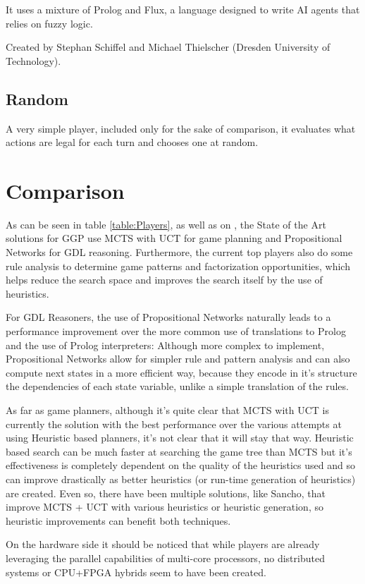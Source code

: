 It uses a mixture of Prolog and Flux, a language designed to write AI agents that relies on fuzzy logic.

Created by Stephan Schiffel and Michael Thielscher (Dresden University of Technology).

\subsection{Random}
A very simple player, included only for the sake of comparison, it evaluates what actions are legal for each turn and chooses one at random.




%
%

\section{Comparison}

As can be seen in table \ref{table:Players}, as well as on \cite{Swiechowski2015}, the State of the Art solutions for \gls{GGP} use \gls{MCTS} with \gls{UCT} for game planning and Propositional Networks for GDL reasoning. Furthermore, the current top players also do some rule analysis to determine game patterns and factorization opportunities, which helps reduce the search space and improves the search itself by the use of heuristics.

For GDL Reasoners, the use of Propositional Networks naturally leads to a performance improvement over the more common use of translations to Prolog and the use of Prolog interpreters: Although more complex to implement, Propositional Networks allow for simpler rule and pattern analysis and can also compute next states in a more efficient way, because they encode in it's structure the dependencies of each state variable, unlike a simple translation of the rules.

As far as game planners, although it's quite clear that \gls{MCTS} with \gls{UCT} is currently the solution with the best performance over the various attempts at using Heuristic based planners, it's not clear that it will stay that way.
Heuristic based search can be much faster at searching the game tree than \gls{MCTS} but it's effectiveness is completely dependent on the quality of the heuristics used and so can improve drastically as better heuristics (or run-time generation of heuristics) are created. Even so, there have been multiple solutions, like Sancho, that improve \gls{MCTS} + \gls{UCT} with various heuristics or heuristic generation, so heuristic improvements can benefit both techniques.

On the hardware side it should be noticed that while players are already leveraging the parallel capabilities of multi-core processors, no distributed systems or CPU+FPGA hybrids seem to have been created.
